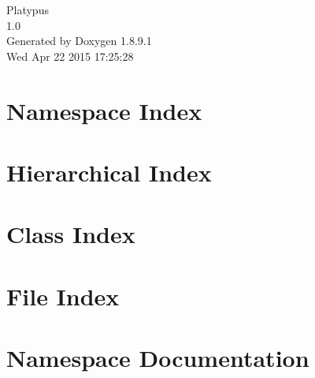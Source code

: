 \documentclass[twoside]{book}
\newcommand{\+}{\discretionary{\mbox{\scriptsize$\hookleftarrow$}}{}{}}
\newcommand{\clearemptydoublepage}{%
  \newpage{\pagestyle{empty}\cleardoublepage}%
}
\begin{document}
\hypersetup{pageanchor=false,
             bookmarks=true,
             bookmarksnumbered=true,
             pdfencoding=unicode
            }
\begin{titlepage}
\vspace*{7cm}
\begin{center}%
{\Large Platypus \\[1ex]\large 1.\+0 }\\
\vspace*{1cm}
{\large Generated by Doxygen 1.8.9.1}\\
\vspace*{0.5cm}
{\small Wed Apr 22 2015 17:25:28}\\
\end{center}
\end{titlepage}
\clearemptydoublepage
\tableofcontents
\clearemptydoublepage
{}
\hypersetup{pageanchor=true}

\chapter{Namespace Index}

\chapter{Hierarchical Index}

\chapter{Class Index}

\chapter{File Index}

\chapter{Namespace Documentation}

























\end{document}
